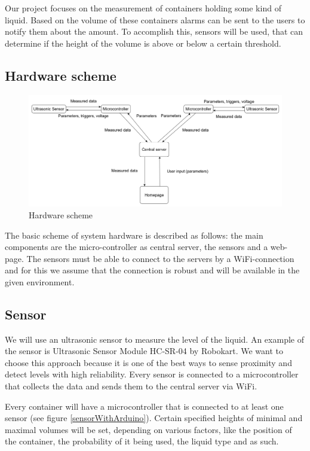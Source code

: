 \documentclass{article}
\begin{document}
Our project focuses on the measurement of containers holding some kind of liquid. Based on the volume of these containers alarms can be sent to the users to notify them about the amount. To accomplish this, sensors will be used, that can determine if the height of the volume is above or below a certain threshold. \par

\subsection{Hardware scheme}

\begin{figure}[h]
\label{scheme}
\hspace{-1cm}
\includegraphics[scale=0.325]{images/circuit3.png}
\caption{Hardware scheme}
\end{figure}

The basic scheme of system hardware is described as follows: the main components
are the micro-controller as central server, the sensors and a web-page. The
sensors must be able to connect to the servers by a WiFi-connection and for this
we assume that the connection is robust and will be available in the given
environment. \par

\subsection{Sensor}
We will use an ultrasonic sensor to measure the level of the liquid. An example of the sensor is Ultrasonic Sensor Module HC-SR-04 by Robokart. 
We want to choose this approach because it is one of the best ways to sense proximity and detect levels with high reliability. Every sensor is connected to a microcontroller 
that collects the data and sends them to the central server via WiFi.  

Every container will have a microcontroller that is connected to at least one sensor (see figure \ref{sensorWithArduino}).
Certain specified heights of minimal and maximal volumes will be set, depending
on various factors, like the position of the container, the probability of it being used, 
the liquid type and as such.
\end{document}
